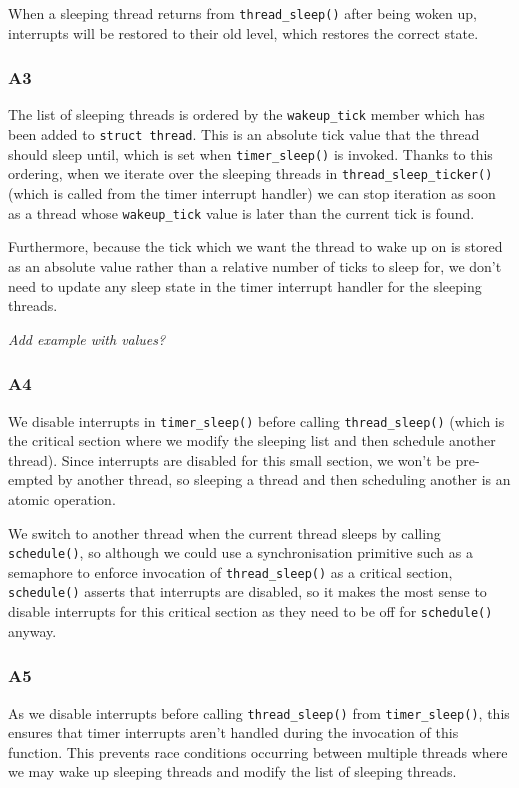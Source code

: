 \documentclass[a4wide, 11pt]{article}
\newcommand{\tx}{\texttt}
\begin{document}
When a sleeping thread returns from \texttt{thread\_sleep()} after being woken up, interrupts will be restored to their old level, which restores the correct state.

\subsubsection{A3}

The list of sleeping threads is ordered by the \tx{wakeup\_tick} member
which has been added to \tx{struct thread}. This is an absolute tick value that the thread 
should sleep until, which is set when \tx{timer\_sleep()} is invoked. Thanks to this ordering, when we iterate over the sleeping threads in \tx{thread\_sleep\_ticker()} (which is called from the
timer interrupt handler) we can stop iteration as soon as a thread whose
\tx{wakeup\_tick} value is later than the current tick is found.

Furthermore, because the tick which we want the thread to wake up on is stored as
an absolute value rather than a relative number of ticks to sleep for, we don't
need to update any sleep state in the timer interrupt handler for the sleeping
threads.

\emph{Add example with values?}

\subsubsection{A4}
We disable interrupts in \texttt{timer\_sleep()} before calling \texttt{thread\_sleep()} (which is the critical section where we modify the sleeping list and then schedule another thread). Since interrupts are disabled for this small section, we won't be pre-empted by another thread, so sleeping a thread and then scheduling  another is an atomic operation.

We switch to another thread when the current thread sleeps by calling \texttt{schedule()}, so although we could use a synchronisation primitive such as a semaphore to enforce invocation of \texttt{thread\_sleep()} as a critical section, \texttt{schedule()} asserts that interrupts are disabled, so it makes the most sense to disable interrupts for this critical section as they need to be off for \texttt{schedule()} anyway.

\subsubsection{A5}
As we disable interrupts before calling \texttt{thread\_sleep()} from \texttt{timer\_sleep()}, this ensures that timer interrupts aren't handled during the invocation of this function. This prevents race conditions occurring between multiple threads where we may wake up sleeping threads and modify the list of sleeping threads.
\end{document}
